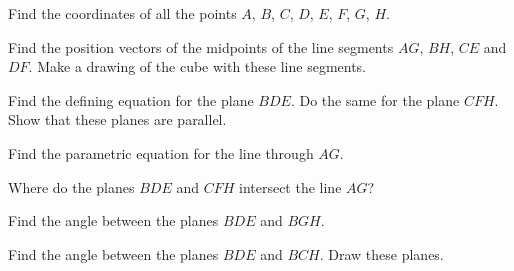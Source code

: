 \begin{multicols}{2}
\subprob Find the coordinates of all the points $A$, $B$, $C$, $D$,
$E$, $F$, $G$, $H$.

\subprob Find the position vectors of the midpoints of the line
segments $AG$, $BH$, $CE$ and $DF$. Make a drawing of the cube with
these line segments.

\subprob Find the defining equation for the plane $BDE$. Do the same
for the plane $CFH$. Show that these planes are parallel.

\subprob Find the parametric equation for the line through $AG$.

\subprob Where do the planes $BDE$ and $CFH$ intersect the line $AG$?

\subprob Find the angle between the planes $BDE$ and $BGH$.

\subprob Find the angle between the planes $BDE$ and $BCH$. Draw these
planes.

\end{multicols}
\noproblemfont







